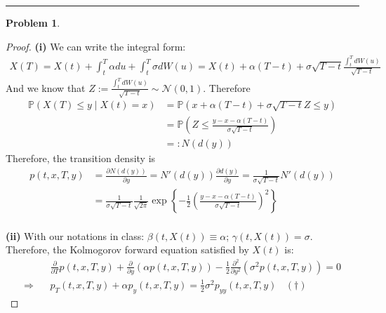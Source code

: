 \documentclass[a4paper, 10pt]{article}
\theoremstyle{definition}
\newtheorem{problem}{Problem}
\theoremstyle{hSol}
\begin{document}
\noindent\rule{16cm}{0.4pt}
\begin{problem} 
\end{problem}
\begin{proof} \textbf{(i)} We can write the integral form:
\begin{equation}
  \begin{split}
    X(T) = X(t) + \int_t^T \alpha du + \int_t^T \sigma dW(u) = X(t) + \alpha(T-t) + \sigma \sqrt{T-t} \frac{\int_t^T dW(u)}{\sqrt{T-t}}
  \end{split}
\end{equation}
And we know that $Z:=\frac{\int_t^T dW(u)}{\sqrt{T-t}} \sim \mathcal{N}(0,1)$. Therefore
\begin{equation}
  \begin{split}
    \mathbb{P}\left(X(T)\leq y\mid X(t)=x\right) &= \mathbb{P}\left(x+\alpha(T-t)+\sigma \sqrt{T-t}Z \leq y\right) \\
    &= \mathbb{P}\left(Z \leq \frac{y-x- \alpha(T-t)}{\sigma\sqrt{T-t}}\right)\\
    &=:N\left(d(y)\right)
  \end{split}
\end{equation}
Therefore, the transition density is
\begin{equation}
  \begin{split}
    p(t,x,T,y) &= \frac{\partial N(d(y))}{\partial y} =N'(d(y)) \frac{\partial d(y)}{\partial y} = \frac{1}{\sigma \sqrt{T-t}} N'(d(y)) \\
    &=\frac{1}{\sigma \sqrt{T-t}} \frac{1}{\sqrt{2\pi}} \exp\left\{-\frac{1}{2}\left(\frac{y-x- \alpha(T-t)}{\sigma\sqrt{T-t}}\right)^2\right\}
  \end{split}
\end{equation}
~\\
\textbf{(ii)} With our notations in class: $\beta(t,X(t)) \equiv \alpha$; $\gamma(t,X(t)) = \sigma$. Therefore, the Kolmogorov forward equation satisfied by $X(t)$ is:
\begin{equation}
  \begin{split}
    &\frac{\partial }{\partial T}p(t,x,T,y) + \frac{\partial }{\partial y} \left(\alpha p(t,x,T,y)\right) - \frac{1}{2} \frac{\partial^2}{\partial y^2}\left(\sigma^2 p(t,x,T,y)\right) = 0\\
    \Rightarrow~~~~&p_T(t,x,T,y) + \alpha p_y(t,x,T,y)  = \frac{1}{2}\sigma^2 p_{yy}(t,x,T,y)~~~~(\dag)
  \end{split}
 \end{equation} 

\end{proof}
\end{document}
